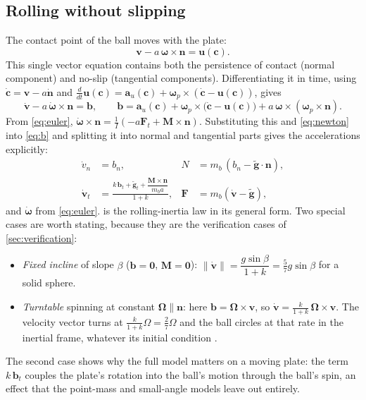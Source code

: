 \documentclass[10pt,a4paper]{article}
\newcommand{\vect}[1]{\bm{#1}}
\newcommand{\hatn}{\vect{n}}
\begin{document}
\subsection{Rolling without slipping}
The contact point of the ball moves with the plate:
\begin{equation}
  \vect v-a\,\vect\omega\times\hatn=\vect u(\vect c). \label{eq:noslip}
\end{equation}
This single vector equation contains both the persistence of contact (normal component) and
no-slip (tangential components). Differentiating it in time, using
$\dot{\vect c}=\vect v-a\dot{\hatn}$ and
$\frac{d}{dt}\vect u(\vect c)=\vect a_u(\vect c)+\vect\omega_p\times(\dot{\vect c}-\vect u(\vect c))$,
gives
\begin{equation}
  \dot{\vect v}-a\,\dot{\vect\omega}\times\hatn=\vect b,\qquad
  \vect b=\vect a_u(\vect c)+\vect\omega_p\times\bigl(\dot{\vect c}-\vect u(\vect c)\bigr)+a\,\vect\omega\times(\vect\omega_p\times\hatn).
  \label{eq:b}
\end{equation}
From \eqref{eq:euler},
$\dot{\vect\omega}\times\hatn=\frac1I\left(-a\vect F_t+\vect M\times\hatn\right)$. Substituting
this and \eqref{eq:newton} into \eqref{eq:b} and splitting it into normal and tangential parts
gives the accelerations explicitly:
\begin{align}
  \dot v_n&=b_n, & N&=m_b\,(b_n-\tilde{\vect g}\cdot\hatn), \label{eq:normal}\\
  \dot{\vect v}_t&=\frac{k\,\vect b_t+\tilde{\vect g}_t+\dfrac{\vect M\times\hatn}{m_ba}}{1+k}, &
  \vect F&=m_b(\dot{\vect v}-\tilde{\vect g}), \label{eq:tangential}
\end{align}
and $\dot{\vect\omega}$ from \eqref{eq:euler}.  is the rolling-inertia law in
its general form. Two special cases are worth stating, because they are the verification
cases of \cref{sec:verification}:
\begin{itemize}
  \item \emph{Fixed incline} of slope $\beta$ ($\vect b=\vect 0$, $\vect M=\vect 0$):
        $\lVert\dot{\vect v}\rVert=\dfrac{g\sin\beta}{1+k}=\frac57g\sin\beta$ for a solid sphere.
  \item \emph{Turntable} spinning at constant $\vect\Omega\parallel\hatn$: here
        $\vect b=\vect\Omega\times\vect v$, so $\dot{\vect v}=\frac{k}{1+k}\,\vect\Omega\times\vect v$. The
        velocity vector turns at $\frac{k}{1+k}\Omega=\frac27\Omega$ and the ball circles at that
        rate in the inertial frame, whatever its initial condition \citep{weckesser1997ball}.
\end{itemize}
The second case shows why the full model matters on a moving plate: the term $k\,\vect b_t$
couples the plate's rotation into the ball's motion through the ball's spin, an effect that the
point-mass and small-angle models leave out entirely.
\end{document}
